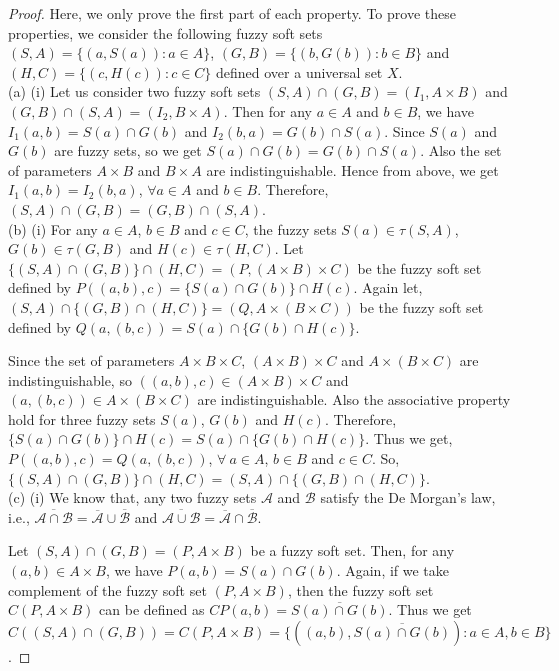 \documentclass[10pt,a4paper]{amsart}
\begin{document}
\begin{proof}

 Here, we only prove the first part of each property. To prove these properties, we consider the following fuzzy soft sets $(S,A)=\{(a, S(a)): a\in A\}$, $(G,B)=\{(b, G(b)): b\in B\}$ and  $(H,C)=\{(c, H(c)): c\in C\}$ defined over a universal set $X$.\\

(a) (i) Let us consider two fuzzy soft sets $(S,A) \cap (G,B)=(I_1, A\times B)$ and $(G,B) \cap (S,A)=(I_2, B\times A)$. Then for any $a\in A$ and $b\in B$, we have $I_1(a,b)=S(a) \cap G(b)$ and $I_2(b,a)=G(b) \cap S(a)$. Since $S(a)$ and $G(b)$ are fuzzy sets, so we get $S(a) \cap G(b)=G(b) \cap S(a)$. Also the set of parameters $A\times B$ and $B\times A$ are indistinguishable. Hence from above, we get $I_1(a,b)= I_2(b,a)$, $\forall a \in A $ and $b\in B$. Therefore, $(S,A) \cap (G,B) = (G,B) \cap (S,A)$.\\


(b) (i) For any $a\in A$, $b\in B$ and $c\in C$, the fuzzy sets $S(a)\in \tau (S,A)$, $G(b)\in \tau (G,B)$ and $H(c)\in \tau (H,C)$. Let $\{(S,A) \cap (G,B)\}\cap (H,C)= (P, (A\times B)\times C)$ be the fuzzy soft set defined by $P((a,b),c)= \{S(a)\cap G(b)\}\cap H(c)$. Again let, $(S,A) \cap \{(G,B)\cap (H,C)\}= (Q, A\times (B\times C))$ be the fuzzy soft set defined by $Q(a,(b,c))= S(a)\cap \{G(b)\cap H(c)\}$.

Since the set of parameters $A\times B \times C$,  $(A\times B) \times C$ and $A\times (B \times C)$ are indistinguishable, so $((a,b),c)\in (A\times B)\times C$ and $(a,(b,c)) \in A\times(B\times C)$ are indistinguishable. Also the associative property hold for three fuzzy sets $S(a)$, $G(b)$ and $H(c)$. Therefore, $\{S(a)\cap G(b)\}\cap H(c)=S(a)\cap \{G(b)\cap H(c)\}$. Thus we get, $  P((a,b),c)= Q(a,(b,c))$, $\forall ~a\in A$, $b\in B$ and $c\in C$. So,  $\{(S,A) \cap (G,B)\}\cap (H,C) = (S,A) \cap \{(G,B)\cap (H,C)\}$.\\

(c) (i) We know that, any two fuzzy sets $\mathcal{A}$ and $\mathcal{B}$ satisfy the De Morgan's law, i.e., $\overline{\mathcal{A} \cap  \mathcal{B}} = \overline{\mathcal{A}}\cup \overline{\mathcal{B}}$ and $\overline{\mathcal{A} \cup  \mathcal{B}} = \overline{\mathcal{A}}\cap \overline{\mathcal{B}}$.

Let $(S,A) \cap (G,B)=(P,A\times B)$ be a fuzzy soft set. Then, for any $(a,b)\in A\times B$, we have $P(a,b)=S(a)\cap G(b)$. Again, if we take complement of the fuzzy soft set $(P,A\times B)$, then the fuzzy soft set $C(P,A\times B)$ can be defined as $CP(a,b)=\overline{S(a)\cap G(b)}$. Thus we get $ C((S,A) \cap (G,B))=C(P,A\times B)=\{((a, b), \overline{S(a)\cap G(b)}): a\in A, b\in B\}$.



\end{proof}
\end{document}
